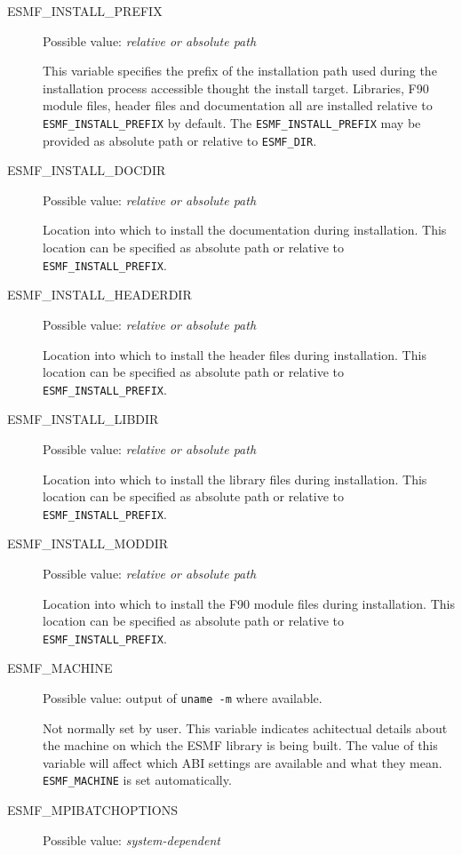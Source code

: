 \begin{description}
\item[ESMF\_INSTALL\_PREFIX]
Possible value: {\em relative or absolute path}

This variable specifies the prefix of the installation path used during the
installation process accessible thought the install target. Libraries, F90
module files, header files and documentation all are installed relative to
{\tt ESMF\_INSTALL\_PREFIX} by default. The {\tt ESMF\_INSTALL\_PREFIX} may be
provided as absolute path or relative to {\tt ESMF\_DIR}.

\item[ESMF\_INSTALL\_DOCDIR]
Possible value: {\em relative or absolute path}

Location into which to install the documentation during installation. This
location can be specified as absolute path or relative to
{\tt ESMF\_INSTALL\_PREFIX}.

\item[ESMF\_INSTALL\_HEADERDIR]
Possible value: {\em relative or absolute path}

Location into which to install the header files during installation. This
location can be specified as absolute path or relative to
{\tt ESMF\_INSTALL\_PREFIX}.

\item[ESMF\_INSTALL\_LIBDIR]
Possible value: {\em relative or absolute path}

Location into which to install the library files during installation. This
location can be specified as absolute path or relative to
{\tt ESMF\_INSTALL\_PREFIX}.

\item[ESMF\_INSTALL\_MODDIR]
Possible value: {\em relative or absolute path}

Location into which to install the F90 module files during installation. This
location can be specified as absolute path or relative to
{\tt ESMF\_INSTALL\_PREFIX}.

\item[ESMF\_MACHINE]
Possible value: output of {\tt uname -m} where available.

Not normally set by user. This variable indicates achitectual details about
the machine on which the ESMF library is being built. The value of this 
variable will affect which ABI settings are available and what they mean. 
{\tt ESMF\_MACHINE} is set automatically.

\item[ESMF\_MPIBATCHOPTIONS]
Possible value: {\em system-dependent}


\end{description}
